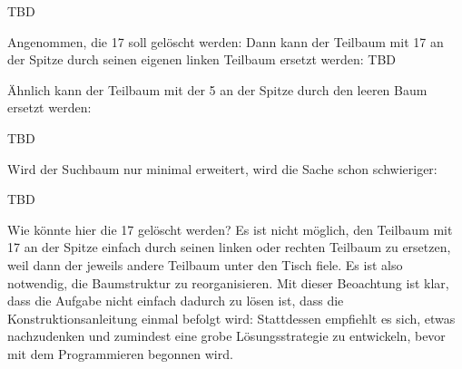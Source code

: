TBD

%
Angenommen, die 17 soll gelöscht werden: Dann kann der Teilbaum mit 17 an
der Spitze durch seinen eigenen linken Teilbaum ersetzt werden:
%
TBD

%
Ähnlich kann der Teilbaum mit der 5 an der Spitze durch den leeren
Baum ersetzt werden:
%

TBD

%
Wird der Suchbaum nur minimal erweitert, wird die Sache schon schwieriger:
%

TBD

%
Wie könnte hier die 17 gelöscht werden? Es ist nicht möglich, den
Teilbaum mit 17 an der Spitze einfach durch seinen linken oder rechten
Teilbaum zu ersetzen, weil dann der jeweils andere Teilbaum unter den
Tisch fiele.  Es ist also notwendig, die Baumstruktur zu
reorganisieren.  Mit dieser Beoachtung ist klar, dass die Aufgabe nicht
einfach dadurch zu lösen ist, dass die Konstruktionsanleitung einmal
befolgt wird: Stattdessen empfiehlt es sich, etwas nachzudenken und
zumindest eine grobe Lösungsstrategie zu entwickeln, bevor mit dem
Programmieren begonnen wird.

